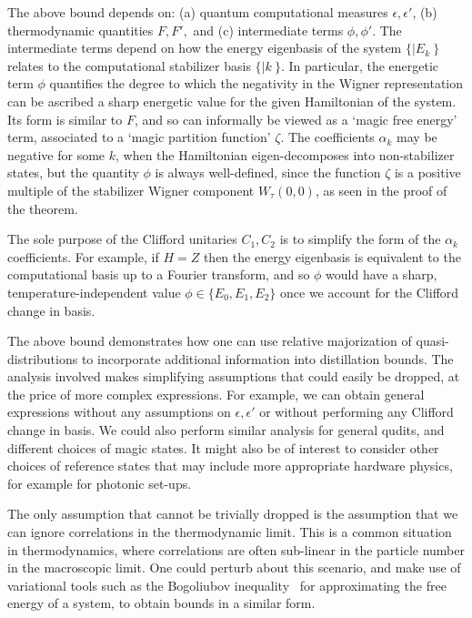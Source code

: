 \documentclass[pra,
aps,
twocolumn,
superscriptaddress,
groupedaddress,
nofootinbib,
reprint
]{revtex4-1}
\begin{document}
The above bound depends on: (a) quantum computational measures $\epsilon, \epsilon'$, (b) thermodynamic quantities $F, F',$  and (c) intermediate terms $\phi, \phi'$. The intermediate terms depend on how the energy eigenbasis of the system $\{|E_k\>\}$ relates to the computational stabilizer basis $\{|k\>\}$.  In particular, the energetic term $\phi$ quantifies the degree to which the negativity in the Wigner representation can be ascribed a sharp energetic value for the given Hamiltonian of the system. Its form is similar to $F$, and so can informally be viewed as a `magic free energy' term, associated to a `magic partition function' $\zeta$. The coefficients $\alpha_k$ may be negative for some $k$, when the Hamiltonian eigen-decomposes into non-stabilizer states, but the quantity $\phi$ is always well-defined, since the function $\zeta$ is a positive multiple of the stabilizer Wigner component $W_\tau(0,0)$, as seen in the proof of the theorem.

The sole purpose of the Clifford unitaries $C_1,C_2$ is to simplify the form of the $\alpha_k$ coefficients. For example, if $H=Z$ then the energy eigenbasis is equivalent to the computational basis up to a Fourier transform, and so $\phi$ would have a sharp, temperature-independent value $\phi \in \{E_0,E_1,E_2\}$ once we account for the Clifford change in basis. 

The above bound demonstrates how one can use relative majorization of quasi-distributions to incorporate additional information into distillation bounds.
The analysis involved makes simplifying assumptions that could easily be dropped, at the price of more complex expressions. For example, we can obtain general expressions without any assumptions on $\epsilon, \epsilon'$ or without performing any Clifford change in basis.
We could also perform similar analysis for general qudits, and different choices of magic states. It might also be of interest to consider other choices of reference states that may include more appropriate hardware physics, for example for photonic set-ups.

The only assumption that cannot be trivially dropped is the assumption that we can ignore correlations in the thermodynamic limit. This is a common situation in thermodynamics, where correlations are often sub-linear in the particle number in the macroscopic limit. One could perturb about this scenario, and make use of variational tools such as the Bogoliubov inequality~\cite{bogolyubov_1966} for approximating the free energy of a system, to obtain bounds in a similar form.
\end{document}
